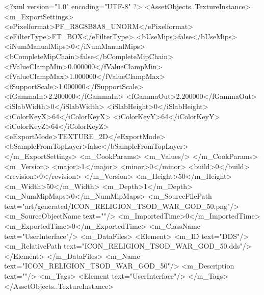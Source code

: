 <?xml version="1.0" encoding="UTF-8" ?>
<AssetObjects..TextureInstance>
	<m_ExportSettings>
		<ePixelformat>PF_R8G8B8A8_UNORM</ePixelformat>
		<eFilterType>FT_BOX</eFilterType>
		<bUseMips>false</bUseMips>
		<iNumManualMips>0</iNumManualMips>
		<bCompleteMipChain>false</bCompleteMipChain>
		<fValueClampMin>0.000000</fValueClampMin>
		<fValueClampMax>1.000000</fValueClampMax>
		<fSupportScale>1.000000</fSupportScale>
		<fGammaIn>2.200000</fGammaIn>
		<fGammaOut>2.200000</fGammaOut>
		<iSlabWidth>0</iSlabWidth>
		<iSlabHeight>0</iSlabHeight>
		<iColorKeyX>64</iColorKeyX>
		<iColorKeyY>64</iColorKeyY>
		<iColorKeyZ>64</iColorKeyZ>
		<eExportMode>TEXTURE_2D</eExportMode>
		<bSampleFromTopLayer>false</bSampleFromTopLayer>
	</m_ExportSettings>
	<m_CookParams>
		<m_Values/>
	</m_CookParams>
	<m_Version>
		<major>1</major>
		<minor>0</minor>
		<build>0</build>
		<revision>0</revision>
	</m_Version>
	<m_Height>50</m_Height>
	<m_Width>50</m_Width>
	<m_Depth>1</m_Depth>
	<m_NumMipMaps>0</m_NumMipMaps>
	<m_SourceFilePath text="art/generated/ICON_RELIGION_TSOD_WAR_GOD_50.png"/>
	<m_SourceObjectName text=""/>
	<m_ImportedTime>0</m_ImportedTime>
	<m_ExportedTime>0</m_ExportedTime>
	<m_ClassName text="UserInterface"/>
	<m_DataFiles>
		<Element>
			<m_ID text="DDS"/>
			<m_RelativePath text="ICON_RELIGION_TSOD_WAR_GOD_50.dds"/>
		</Element>
	</m_DataFiles>
	<m_Name text="ICON_RELIGION_TSOD_WAR_GOD_50"/>
	<m_Description text=""/>
	<m_Tags>
		<Element text="UserInterface"/>
	</m_Tags>
</AssetObjects..TextureInstance>
